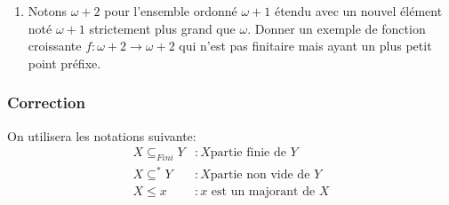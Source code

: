 \documentclass[12pt]{article}
\begin{document}
\begin{enumerate}
        \textit{Théorème 1.1 (Kleene). Soit $A$ un ensemble inductif doté d’un plus petit élément
qu’on notera $\bot$. Toute endofonction finitaire $f$ de $A$ a un plus petit point préfixe $\mu f$ 
calculable par itération dénombrable à partir de $\bot$.}\\ 

\textit{Indication:} vous inspirer du résultat étudié  lors des séances  précédentes  concernant les plus petits points fixes de fonctions  préservant les suites croissantes.
\item Notons $\omega + 2$ pour l'ensemble ordonné $\omega + 1$ étendu avec un nouvel élément noté $\omega + 1$ strictement plus grand  que $\omega$. Donner un exemple de fonction croissante $f: \omega + 2 \rightarrow \omega + 2$ qui n'est  pas finitaire mais ayant  un plus petit  point préfixe.

\end{enumerate}


\subsubsection*{Correction}

On utilisera les notations suivante:
\begin{align*}
X\subseteq_{Fini} Y &: X \text{partie finie de } Y \\
    X \subseteq^* Y &: X \text{partie non vide de } Y \\ 
    X \leq x & : x \text{ est un majorant de } X
\end{align*}
\end{document}
